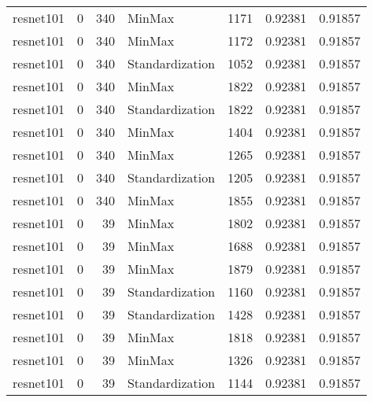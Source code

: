 \begin{tabular}{lrrlrrr}
 resnet101          &             0 &           340 & MinMax          &       1171 &          0.92381 &    0.91857 \\
 resnet101          &             0 &           340 & MinMax          &       1172 &          0.92381 &    0.91857 \\
 resnet101          &             0 &           340 & Standardization &       1052 &          0.92381 &    0.91857 \\
 resnet101          &             0 &           340 & MinMax          &       1822 &          0.92381 &    0.91857 \\
 resnet101          &             0 &           340 & Standardization &       1822 &          0.92381 &    0.91857 \\
 resnet101          &             0 &           340 & MinMax          &       1404 &          0.92381 &    0.91857 \\
 resnet101          &             0 &           340 & MinMax          &       1265 &          0.92381 &    0.91857 \\
 resnet101          &             0 &           340 & Standardization &       1205 &          0.92381 &    0.91857 \\
 resnet101          &             0 &           340 & MinMax          &       1855 &          0.92381 &    0.91857 \\
 resnet101          &             0 &            39 & MinMax          &       1802 &          0.92381 &    0.91857 \\
 resnet101          &             0 &            39 & MinMax          &       1688 &          0.92381 &    0.91857 \\
 resnet101          &             0 &            39 & MinMax          &       1879 &          0.92381 &    0.91857 \\
 resnet101          &             0 &            39 & Standardization &       1160 &          0.92381 &    0.91857 \\
 resnet101          &             0 &            39 & Standardization &       1428 &          0.92381 &    0.91857 \\
 resnet101          &             0 &            39 & MinMax          &       1818 &          0.92381 &    0.91857 \\
 resnet101          &             0 &            39 & MinMax          &       1326 &          0.92381 &    0.91857 \\
 resnet101          &             0 &            39 & Standardization &       1144 &          0.92381 &    0.91857 \\

\end{tabular}
